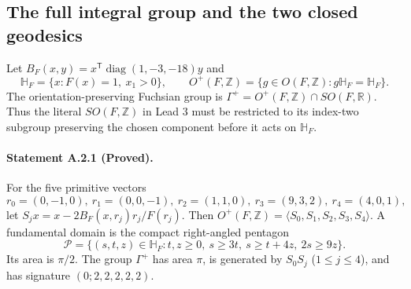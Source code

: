 \subsection{The full integral group and the two closed geodesics}
Let $B_F(x,y)=x^{\mathsf T}\operatorname{diag}(1,-3,-18)y$ and
\[
 \mathbb H_F=\{x:F(x)=1,\ x_1>0\},\qquad
 O^+(F,\mathbb Z)=\{g\in O(F,\mathbb Z):g\mathbb H_F=\mathbb H_F\}.
\]
The orientation-preserving Fuchsian group is
$\Gamma^+=O^+(F,\mathbb Z)\cap SO(F,\mathbb R)$.
Thus the literal $SO(F,\mathbb Z)$ in Lead 3 must be restricted to its
index-two subgroup preserving the chosen component before it acts on
$\mathbb H_F$.

\paragraph{Statement A.2.1 (Proved).}
For the five primitive vectors
\[
 r_0=(0,-1,0),\ r_1=(0,0,-1),\ r_2=(1,1,0),\
 r_3=(9,3,2),\ r_4=(4,0,1),
\]
let $S_jx=x-2B_F(x,r_j)r_j/F(r_j)$. Then
$O^+(F,\mathbb Z)=\langle S_0,S_1,S_2,S_3,S_4\rangle$.
A fundamental domain is the compact right-angled pentagon
\[
 \mathcal P=\{(s,t,z)\in\mathbb H_F:
 t,z\geq0,\ s\geq3t,\ s\geq t+4z,\ 2s\geq9z\}.
\]
Its area is $\pi/2$. The group $\Gamma^+$ has area $\pi$, is generated by
$S_0S_j$ ($1\leq j\leq4$), and has signature $(0;2,2,2,2,2)$.
